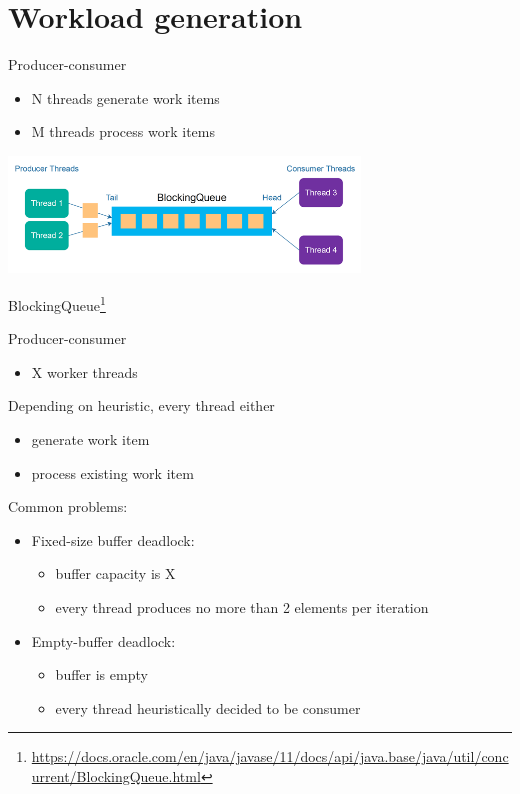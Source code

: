 \section{Workload generation}
\showTOC

\begin{frame}{Producer-consumer}

\begin{itemize}
    \item N threads generate work items
    \item M threads process work items
\end{itemize}

\begin{center}
\includegraphics[width=0.7\textwidth]{./pics/prod-cons.png}
\end{center}

BlockingQueue\footnote{\tiny\url{https://docs.oracle.com/en/java/javase/11/docs/api/java.base/java/util/concurrent/BlockingQueue.html}}

\end{frame}



\begin{frame}{Producer-consumer}

\begin{itemize}
    \item X worker threads
\end{itemize}

Depending on heuristic, every thread either
\begin{itemize}
    \item generate work item
    \item process existing work item
\end{itemize}

\pause

Common problems:
\begin{itemize}
    \item Fixed-size buffer deadlock: 
    \begin{itemize} 
        \item buffer capacity is X
        \item every thread produces no more than 2 elements per iteration
    \end{itemize}

    \item Empty-buffer deadlock: 
    \begin{itemize} 
        \item buffer is empty
        \item every thread heuristically decided to be consumer
    \end{itemize}
\end{itemize}

\end{frame}

